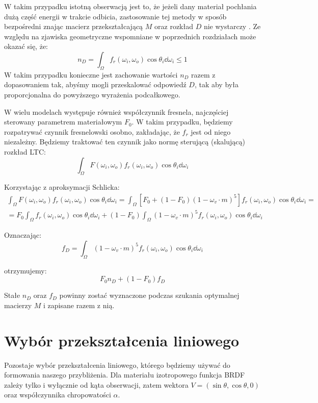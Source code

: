 \documentclass[../main.tex]{subfiles}
\begin{document}
W takim przypadku istotną obserwacją jest to, że jeżeli dany materiał pochłania dużą część energii w trakcie odbicia, zastosowanie tej metody w sposób bezpośredni znając macierz przekształcającą $M$ oraz rozkład $D$ nie wystarczy \cite{LTCFresnelApprox}. Ze względu na zjawiska geometryczne wspomniane w poprzednich rozdziałach może okazać się, że:
\[
    n_D = \int_{\Omega} {
        f_r(\omega_i, \omega_o) \cos\theta_i 
        \dd \omega_i
    } \leq 1
\]
W takim przypadku konieczne jest zachowanie wartości $n_D$ razem z dopasowaniem tak, abyśmy mogli przeskalować odpowiedź $D$, tak aby była proporcjonalna do powyższego wyrażenia podcałkowego.

W wielu modelach występuje również współczynnik fresnela, najczęściej sterowany parametrem materiałowym $F_0$. W takim przypadku, będziemy rozpatrywać czynnik fresnelowski osobno, zakładając, że $f_r$ jest od niego niezależny. Będziemy traktować ten czynnik jako normę sterującą (skalującą) rozkład LTC:
\[
\int_{\Omega} {
    F(\omega_i, \omega_o)
    f_r(\omega_i, \omega_o) 
    \cos\theta_i 
    \dd \omega_i
}
\]

Korzystając z aproksymacji Schlicka: 
\begin{gather*}
\int_{\Omega} {
    F(\omega_i, \omega_o)
    f_r(\omega_i, \omega_o) 
    \cos\theta_i 
    \dd \omega_i
} =
\int_{\Omega} {
    \left[
        F_0 + (1-F_0)(1 - \omega_v \cdot m)^5
    \right]
    f_r(\omega_i, \omega_o) 
    \cos\theta_i 
    \dd \omega_i
} = \\
= F_0 \int_{\Omega} {
    f_r(\omega_i, \omega_o) 
    \cos\theta_i 
    \dd \omega_i
} + (1-F_0) \int_{\Omega} {
    (1 - \omega_v \cdot m)^5
    f_r(\omega_i, \omega_o) 
    \cos\theta_i 
    \dd \omega_i
}
\end{gather*}

Oznaczając:
\[
    f_D = \int_{\Omega} {
        (1 - \omega_v \cdot m)^5
        f_r(\omega_i, \omega_o) 
        \cos\theta_i 
        \dd \omega_i
    }
\]

\noindent otrzymujemy:
\[
    F_0 n_D + (1-F_0) f_D
\]

Stałe $n_D$ oraz $f_D$ powinny zostać wyznaczone podczas szukania optymalnej macierzy $M$ i zapisane razem z nią.


\section{Wybór przekształcenia liniowego}

Pozostaje wybór przekształcenia liniowego, którego będziemy używać do
formowania naszego przybliżenia. Dla materiału izotropowego funkcja BRDF
zależy tylko i wyłącznie od kąta obserwacji, zatem wektora
$V = (\sin\theta, \cos\theta, 0)$
oraz współczynnika chropowatości $\alpha$.
\end{document}
